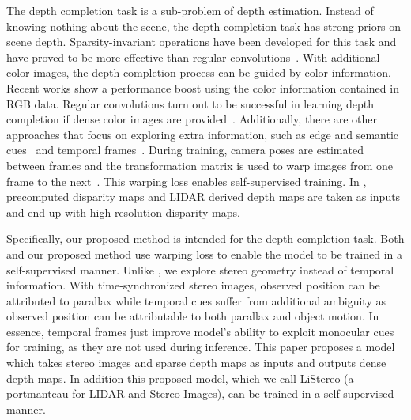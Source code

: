 \documentclass[letterpaper, 10 pt, conference]{ieeeconf}
\begin{document}
    The depth completion task is a sub-problem of depth estimation. Instead of knowing nothing about the scene, the depth completion task has strong priors on scene depth.  Sparsity-invariant operations have been developed for this task and have proved to be more effective than regular convolutions~\cite{sparsityCNN,HmsNet}. With additional color images, the depth completion process can be guided by color information. Recent works \cite{chen2018estimating,Sparse2Dense,dfusenet} show a performance boost using the color information contained in RGB data. Regular convolutions turn out to be successful in learning depth completion if dense color images are provided~\cite{jaritz2018sparse}. Additionally, there are other approaches that focus on exploring extra information, such as edge and semantic cues~\cite{semanticallyDepth} and temporal frames~\cite{maSelf}. During training, camera poses are estimated between frames and the transformation matrix is used to warp images from one frame to the next~\cite{maSelf}. This warping loss enables self-supervised training. In \cite{park2018high}, precomputed disparity maps and LIDAR derived depth maps are taken as inputs and end up with high-resolution disparity maps.
    
    Specifically, our proposed method is intended for the depth completion task. Both \cite{maSelf} and our proposed method use warping loss to enable the model to be trained in a self-supervised manner. Unlike \cite{maSelf}, we explore stereo geometry instead of temporal information. With time-synchronized stereo images, observed position can be attributed to parallax while temporal cues suffer from additional ambiguity as observed position can be attributable to both parallax and object motion. In essence, temporal frames just improve model's ability to exploit monocular cues for training, as they are not used during inference. This paper proposes a model which takes stereo images and sparse depth maps as inputs and outputs dense depth maps. In addition this proposed model, which we call LiStereo (a portmanteau for LIDAR and Stereo Images), can be trained in a self-supervised manner.
\end{document}
